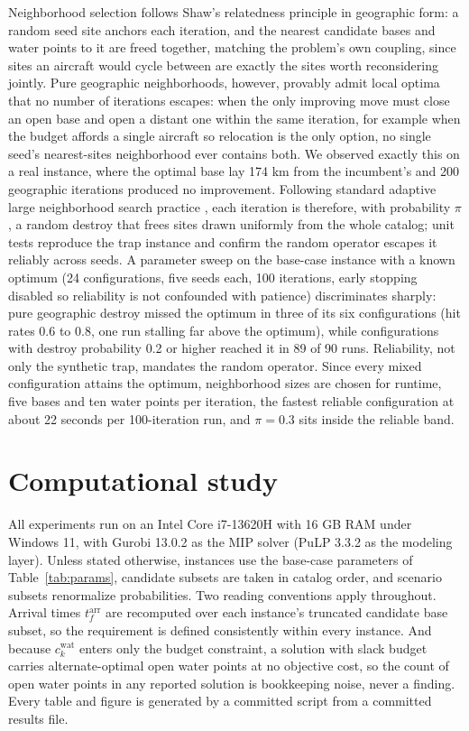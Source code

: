 \documentclass[11pt]{article}
\begin{document}
Neighborhood selection follows Shaw's relatedness principle
\citep{pisinger2010} in geographic form: a random seed site anchors
each iteration, and the
nearest candidate bases and water points to it are freed together,
matching the problem's own coupling, since sites an aircraft would
cycle between are exactly the sites worth reconsidering jointly. Pure
geographic neighborhoods, however, provably admit local optima that no
number of iterations escapes: when the only improving move must close
an open base and open a distant one within the same iteration, for
example when the budget affords a single aircraft so relocation is the
only option, no single seed's nearest-sites neighborhood ever contains
both. We observed exactly this on a real instance, where the optimal
base lay 174 km from the incumbent's and 200 geographic iterations
produced no improvement. Following standard adaptive large neighborhood
search practice \citep{ropke2006}, each iteration is therefore, with
probability $\pi$, a random destroy that frees sites drawn uniformly
from the whole catalog; unit tests reproduce the trap instance and
confirm the random operator escapes it reliably across seeds. A
parameter sweep on the base-case instance with a known optimum (24
configurations, five seeds each, 100 iterations, early stopping
disabled so reliability is not confounded with patience)
discriminates sharply: pure geographic destroy missed the optimum in
three of its six configurations (hit rates 0.6 to 0.8, one run
stalling far above the optimum), while configurations with destroy
probability 0.2 or higher reached it in 89 of 90 runs. Reliability,
not only the synthetic trap, mandates the random operator. Since
every mixed configuration attains the optimum, neighborhood sizes
are chosen for runtime, five bases and ten water points per
iteration, the fastest reliable configuration at about 22 seconds
per 100-iteration run, and $\pi = 0.3$ sits inside the reliable
band.

\section{Computational study}
\label{sec:experiments}

All experiments run on an Intel Core i7-13620H with 16 GB RAM under
Windows 11, with Gurobi 13.0.2 as the MIP solver (PuLP 3.3.2 as the
modeling layer). Unless stated otherwise, instances use the base-case
parameters of Table~\ref{tab:params}, candidate subsets are taken in
catalog order, and scenario subsets renormalize probabilities. Two
reading conventions apply throughout. Arrival times
$t^{\mathrm{arr}}_f$ are recomputed over each instance's truncated
candidate base subset, so the requirement is defined consistently
within every instance. And because $c^{\mathrm{wat}}_k$ enters only
the budget constraint, a solution with slack budget carries
alternate-optimal open water points at no objective cost, so the
count of open water points in any reported solution is bookkeeping
noise, never a finding. Every table and figure is generated by a
committed script from a committed results file.
\end{document}
